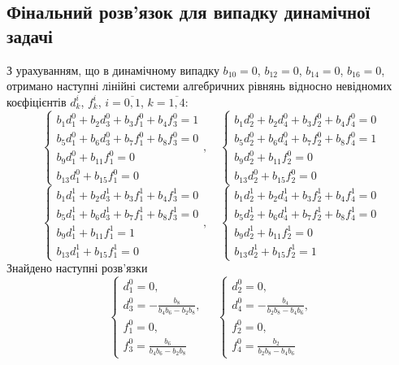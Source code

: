 \subsection*{Фінальний розв'язок для випадку динамічної задачі}
З урахуванням, що в динамічному випадку $b_{10} = 0$, $b_{12} = 0$, $b_{14} = 0$, $b_{16} = 0$,
отримано наступні лінійні системи алгебричних рівнянь відносно невідномих коєфіцієнтів $d_k^i$, $f_k^i$, $i=\overline{0,1}$, $k=\overline{1,4}$:
\begin{equation*}
    \begin{cases}
        b_1 d_1^0 + b_2 d_3^0 + b_3 f_1^0 + b_4 f_3^0 = 1 \\
        b_5 d_1^0 + b_6 d_3^0 + b_7 f_1^0 + b_8 f_3^0 = 0 \\
        b_9 d_1^0 + b_{11} f_1^0= 0 \\
        b_{13} d_1^0 + b_{15} f_1^0= 0
    \end{cases}, \quad
    \begin{cases}
        b_1 d_2^0 + b_2 d_4^0 + b_3 f_2^0 + b_4 f_4^0 = 0 \\
        b_5 d_2^0 + b_6 d_4^0 + b_7 f_2^0 + b_8 f_4^0 = 1 \\
        b_9 d_2^0 + b_{11} f_2^0 = 0 \\
        b_{13} d_2^0 + b_{15} f_2^0 = 0
    \end{cases}
\end{equation*}
\begin{equation*}
    \begin{cases}
        b_1 d_1^1 + b_2 d_3^1 + b_3 f_1^1 + b_4 f_3^1 = 0 \\
        b_5 d_1^1 + b_6 d_3^1 + b_7 f_1^1 + b_8 f_3^1 = 0 \\
        b_9 d_1^1 + b_{11} f_1^1 = 1 \\
        b_{13} d_1^1 + b_{15} f_1^1 = 0
    \end{cases}, \quad
    \begin{cases}
        b_1 d_2^1 + b_2 d_4^1 + b_3 f_2^1 + b_4 f_4^1 = 0 \\
        b_5 d_2^1 + b_6 d_4^1 + b_7 f_2^1 + b_8 f_4^1 = 0 \\
        b_9 d_2^1 + b_{11} f_2^1 = 0 \\
        b_{13} d_2^1 + b_{15} f_2^1 = 1
    \end{cases}
\end{equation*}
Знайдено наступні розв'язки
\begin{equation*}
    \begin{cases}
        d_1^0 = 0, \\
        d_3^0 = -\frac{b_8}{b_4 b_6 - b_2 b_8}, \\
        f_1^0 = 0, \\
        f_3^0 = \frac{b_6}{b_4 b_6 - b_2 b_8}
    \end{cases} \quad
    \begin{cases}
        d_2^0 = 0, \\
        d_4^0 = -\frac{b_4}{b_2 b_8 - b_4 b_6}, \\
        f_2^0 = 0, \\
        f_4^0 = \frac{b_2}{b_2 b_8 - b_4 b_6}
    \end{cases}
\end{equation*}
